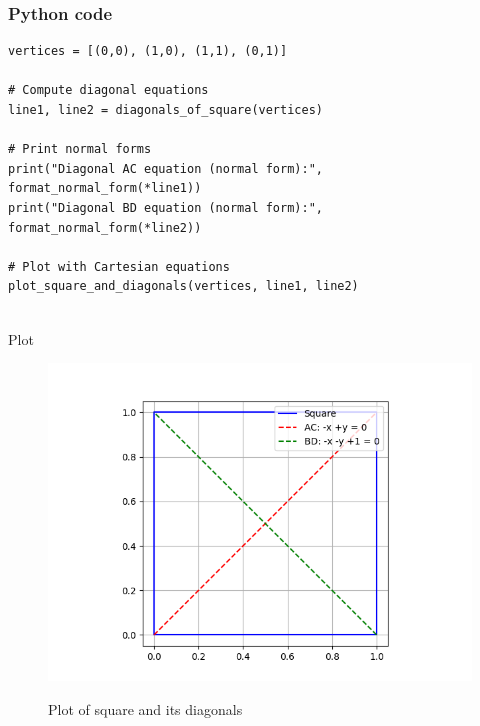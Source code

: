 \documentclass{beamer}
\begin{document}
\begin{frame}[fragile]
    \frametitle{Python code}

    \begin{lstlisting}
vertices = [(0,0), (1,0), (1,1), (0,1)]

# Compute diagonal equations
line1, line2 = diagonals_of_square(vertices)

# Print normal forms
print("Diagonal AC equation (normal form):", format_normal_form(*line1))
print("Diagonal BD equation (normal form):", format_normal_form(*line2))

# Plot with Cartesian equations
plot_square_and_diagonals(vertices, line1, line2)


    \end{lstlisting}
\end{frame}

\begin{frame}{Plot}
    \begin{figure}[H]
    \centering
    \caption{Plot of square and its diagonals}
    \includegraphics[width=0.6\columnwidth]{figs/Figure_1.png}
    \label{fig:1}
    \end{figure}
\end{frame}
\end{document}
